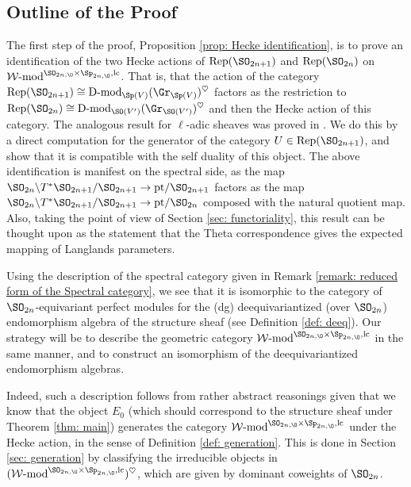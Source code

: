 \documentclass[11pt]{article}
\begin{document}
\subsection{Outline of the Proof}
The first step of the proof, Proposition \ref{prop: Hecke identification}, is to prove an identification of the two Hecke actions of $\mathrm{Rep}(\SO_{2n+1})$ and $\mathrm{Rep}(\SO_{2n})$ on $\operatorname{\mathcal{W}-\mathrm{mod}}^{\SO_{2n,\O}\times \Sp_{2n,\O},\mathrm{lc}}$. That is, that the action of the category $\mathrm{Rep}(\SO_{2n+1})\cong \operatorname{D-mod}_{\Sp(V)}(\Gr_{\Sp(V)})^\heartsuit$ factors as the restriction to $\mathrm{Rep}(\SO_{2n})\cong \operatorname{D-mod}_{\SO(V')}(\Gr_{\SO(V')})^\heartsuit$ and then the Hecke action of this category. The analogous result for $\ell$-adic sheaves was proved in \cite{Lys}.
We do this by a direct computation for the generator of the category $U\in \mathrm{Rep}(\SO_{2n+1})$, and show that it is compatible with the self duality of this object. 
The above identification is manifest on the spectral side, as the map $\SO_{2n}\backslash T^*\SO_{2n+1} / \SO_{2n+1}\to \mathrm{pt}/\SO_{2n+1}$ factors as the map $\SO_{2n}\backslash T^*\SO_{2n+1} / \SO_{2n+1}\to \mathrm{pt}/\SO_{2n}$ composed with the natural quotient map.
Also, taking the point of view of Section \ref{sec: functoriality}, this result can be thought upon as the statement that the Theta correspondence gives the expected mapping of Langlands parameters.

Using the description of the spectral category given in Remark \ref{remark: reduced form of the Spectral category}, we see that it is isomorphic to the category of $\SO_{2n}$-equivariant perfect modules for the (dg) deequivariantized (over $\SO_{2n}$) endomorphism algebra of the structure sheaf (see Definition \ref{def: deeq}). Our strategy will be to describe the geometric category $\operatorname{\mathcal{W}-\mathrm{mod}}^{\SO_{2n,\O}\times \Sp_{2n,\O},\mathrm{lc}}$ in the same manner, and to construct an isomorphism of the deequivariantized endomorphism algebras.

Indeed, such a description follows from rather abstract reasonings given that we know that the object $E_0$ (which should correspond to the structure sheaf under Theorem \ref{thm: main}) generates the category $\operatorname{\mathcal{W}-\mathrm{mod}}^{\SO_{2n,\O}\times \Sp_{2n,\O},\mathrm{lc}}$ under the Hecke action, in the sense of Definition \ref{def: generation}. This is done in Section \ref{sec: generation} by classifying the irreducible objects in $(\operatorname{\mathcal{W}-\mathrm{mod}}^{\SO_{2n,\O}\times \Sp_{2n,\O},\mathrm{lc}})^\heartsuit$, which are given by dominant coweights of $\SO_{2n}$.
\end{document}
